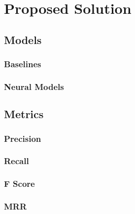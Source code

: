 \chapter{Proposed Solution}

\section{Models}
\subsection{Baselines}
\subsection{Neural Models}

\section{Metrics}
\subsection{Precision}
\subsection{Recall}
\subsection{F Score}
\subsection{MRR}